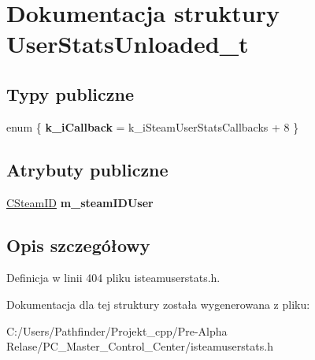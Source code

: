 \hypertarget{struct_user_stats_unloaded__t}{}\section{Dokumentacja struktury User\+Stats\+Unloaded\+\_\+t}
\label{struct_user_stats_unloaded__t}
\subsection*{Typy publiczne}
\begin{DoxyCompactItemize}
\item 
\mbox{\label{struct_user_stats_unloaded__t_a5a9c10a0f199b101c166cb13fa64a561}} 
enum \{ {\bfseries k\+\_\+i\+Callback} = k\+\_\+i\+Steam\+User\+Stats\+Callbacks + 8
 \}
\end{DoxyCompactItemize}
\subsection*{Atrybuty publiczne}
\begin{DoxyCompactItemize}
\item 
\mbox{\label{struct_user_stats_unloaded__t_ae88668ae8a53ea70d142b9ab1856350f}} 
\hyperlink{class_c_steam_i_d}{C\+Steam\+ID} {\bfseries m\+\_\+steam\+I\+D\+User}
\end{DoxyCompactItemize}


\subsection{Opis szczegółowy}


Definicja w linii 404 pliku isteamuserstats.\+h.



Dokumentacja dla tej struktury została wygenerowana z pliku\+:\begin{DoxyCompactItemize}
\item 
C\+:/\+Users/\+Pathfinder/\+Projekt\+\_\+cpp/\+Pre-\/\+Alpha Relase/\+P\+C\+\_\+\+Master\+\_\+\+Control\+\_\+\+Center/isteamuserstats.\+h\end{DoxyCompactItemize}
